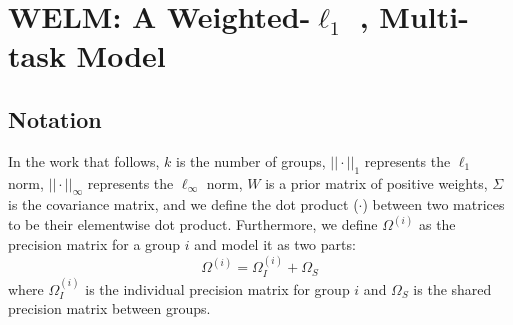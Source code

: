 \documentclass{article}
\begin{document}
\section{WELM: A Weighted-$\ell_1$ , Multi-task Model}
\label{sec:model}
\subsection{Notation}
In the work that follows, $k$ is the number of groups, $||\cdot ||_1$ represents the $\ell_1$ norm, $||\cdot ||_\infty$ represents the $\ell_\infty$ norm, $W$ is a prior matrix of positive weights, $\Sigma$ is the covariance matrix, and we define the dot product ($\cdot$) between two matrices to be their elementwise dot product. Furthermore, we define $\Omega^{(i)}$ as the precision matrix for a group $i$ and model it as two parts:
\begin{equation}
\label{eq:omega_i}
\Omega^{(i)} = \Omega_I^{(i)} + \Omega_S
\end{equation}
where $\Omega_I^{(i)}$ is the individual precision matrix for group $i$ and $\Omega_S$ is the shared precision matrix between groups.
\end{document}
